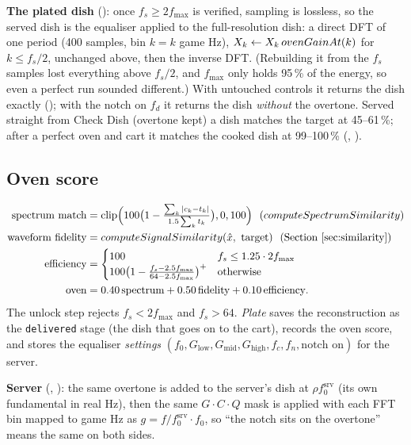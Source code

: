 \documentclass[11pt,a4paper]{article}
\begin{document}
\textbf{The plated dish} (): once $f_s\ge2f_{\max}$ is verified, sampling is
lossless, so the served dish is the equaliser applied to the full-resolution dish: a direct DFT
of one period (400 samples, bin $k=k$ game Hz), $X_k\leftarrow X_k\,\fn{ovenGainAt}(k)$ for
$k\le f_s/2$, unchanged above, then the inverse DFT. (Rebuilding it from the $f_s$ samples lost
everything above $f_s/2$, and $f_{\max}$ only holds 95\,\% of the energy, so even a perfect run
sounded different.) With untouched controls it returns the dish exactly
(); with the notch on $f_d$ it returns the dish
\emph{without} the overtone. Served straight from Check Dish (overtone kept) a dish matches the
target at 45--61\,\%; after a perfect oven and cart it matches the cooked dish at 99--100\,\%
(, ).

\subsection{Oven score}
\begin{align*}
\text{spectrum match}&=\operatorname{clip}\Bigl(100\bigl(1-\tfrac{\sum_k|c_k-t_k|}{1.5\sum_k t_k}\bigr),0,100\Bigr)\ \ (\fn{computeSpectrumSimilarity})\\
\text{waveform fidelity}&=\fn{computeSignalSimilarity}(\hat x,\ \text{target})\ \ (\text{Section~\ref{sec:similarity}})\\
\text{efficiency}&=\begin{cases}100 & f_s\le1.25\cdot2f_{\max}\\
100\bigl(1-\frac{f_s-2.5f_{\max}}{64-2.5f_{\max}}\bigr)^+ & \text{otherwise}\end{cases}\\
\text{oven}&=0.40\,\text{spectrum}+0.50\,\text{fidelity}+0.10\,\text{efficiency}.
\end{align*}
The unlock step rejects $f_s<2f_{\max}$ and $f_s>64$. \emph{Plate} saves the reconstruction as
the \texttt{delivered} stage (the dish that goes on to the cart), records the oven score, and
stores the equaliser \emph{settings} $(f_0, G_{\text{low}}, G_{\text{mid}}, G_{\text{high}}, f_c, f_n,
\text{notch on})$ for the server.

\textbf{Server} (, ): the same overtone is added to
the server's dish at $\rho f_0^{\text{srv}}$ (its own fundamental in real Hz), then the same
$G\cdot C\cdot Q$ mask is applied with each FFT bin mapped to game Hz as
$g=f/f_0^{\text{srv}}\cdot f_0$, so ``the notch sits on the overtone'' means the same on both sides.
\end{document}

